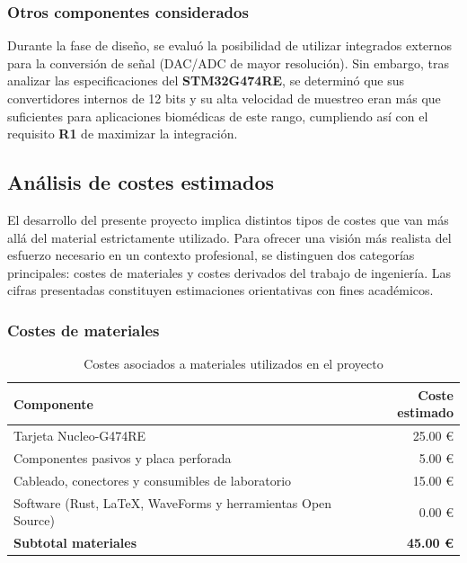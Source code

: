 \documentclass[11pt,a4paper]{article}
\begin{document}
\subsubsection{Otros componentes considerados}
Durante la fase de diseño, se evaluó la posibilidad de utilizar integrados externos para la conversión de señal (DAC/ADC de mayor resolución). Sin embargo, tras analizar las especificaciones del \textbf{STM32G474RE}, se determinó que sus convertidores internos de 12 bits y su alta velocidad de muestreo eran más que suficientes para aplicaciones biomédicas de este rango, cumpliendo así con el requisito \textbf{R1} de maximizar la integración.

\subsection{Análisis de costes estimados}

El desarrollo del presente proyecto implica distintos tipos de costes que van más allá del material estrictamente utilizado. Para ofrecer una visión más realista del esfuerzo necesario en un contexto profesional, se distinguen dos categorías principales: costes de materiales y costes derivados del trabajo de ingeniería. Las cifras presentadas constituyen estimaciones orientativas con fines académicos.

\subsubsection*{Costes de materiales}

\begin{table}[H]
    \centering
    \begin{tabular}{|l|r|}
        \hline
        \textbf{Componente} & \textbf{Coste estimado} \\ \hline
        Tarjeta Nucleo-G474RE & 25.00 € \\ \hline
        Componentes pasivos y placa perforada & 5.00 € \\ \hline
        Cableado, conectores y consumibles de laboratorio & 15.00 € \\ \hline
        Software (Rust, LaTeX, WaveForms y herramientas Open Source) & 0.00 € \\ \hline
        \textbf{Subtotal materiales} & \textbf{45.00 €} \\ \hline
    \end{tabular}
    \caption{Costes asociados a materiales utilizados en el proyecto}
\end{table}
\end{document}
